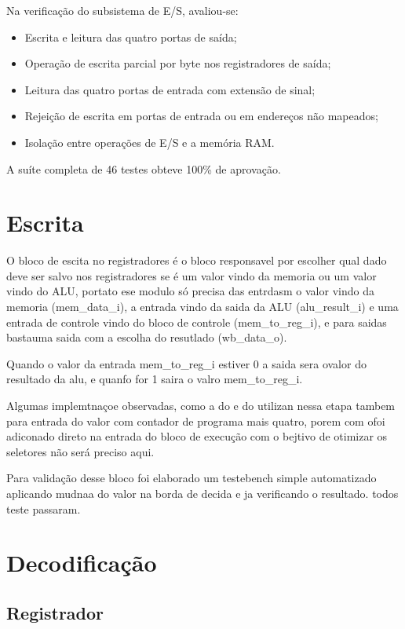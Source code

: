Na verificação do subsistema de E/S, avaliou-se:
\begin{itemize}
    \item Escrita e leitura das quatro portas de saída;
    \item Operação de escrita parcial por byte nos registradores de saída;
    \item Leitura das quatro portas de entrada com extensão de sinal;
    \item Rejeição de escrita em portas de entrada ou em endereços não mapeados;
    \item Isolação entre operações de E/S e a memória RAM.
\end{itemize}

A suíte completa de 46 testes obteve 100\% de aprovação.

\section{Escrita}
\label{sec:escrita}

O bloco de escita no registradores é o bloco responsavel por escolher qual dado deve ser salvo nos registradores se é um valor vindo da memoria ou um valor vindo do ALU, portato ese modulo só precisa das entrdasm o valor vindo da memoria (mem_data_i), a entrada vindo da saida da ALU (alu_result_i) e uma entrada de controle vindo do bloco de controle (mem_to_reg_i), e para saidas bastauma saida com a escolha do resutlado (wb_data_o).

Quando o valor da entrada mem_to_reg_i estiver 0 a saida sera ovalor do resultado da alu, e quanfo for 1 saira o valro mem_to_reg_i. 

Algumas implemtnaçoe  observadas, como a do e do  utilizan nessa etapa tambem para entrada do valor com contador de programa mais quatro, porem com ofoi adiconado direto na entrada do bloco de execução com o bejtivo de otimizar os seletores não será preciso aqui.

Para validação desse bloco foi elaborado um testebench simple automatizado aplicando mudnaa do valor na borda de decida e ja verificando o resultado. todos teste passaram.

\section{Decodificação}
\label{sec:decodificacao}


\subsection{Registrador}
\label{sub:registrador}

